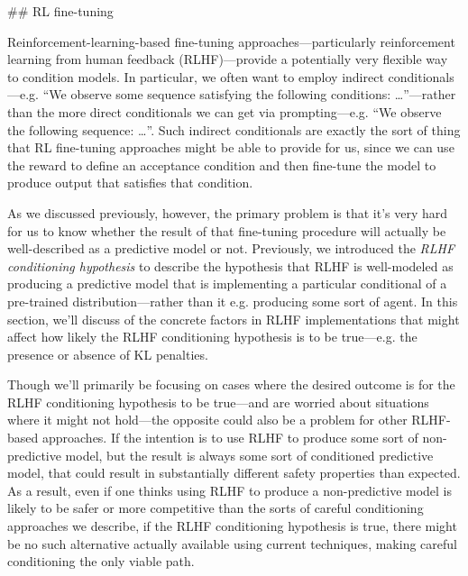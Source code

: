 {## RL fine-tuning

Reinforcement-learning-based fine-tuning approaches---particularly reinforcement learning from human feedback (RLHF)---provide a potentially very flexible way to condition models\cite{TODO: cite https://www.alignmentforum.org/posts/chevXfQmRYrTZnj8r/conditioning-prompts-and-fine-tuning}. In particular, we often want to employ indirect conditionals---e.g. ``We observe some sequence satisfying the following conditions: …''---rather than the more direct conditionals we can get via prompting---e.g. ``We observe the following sequence: …''. Such indirect conditionals are exactly the sort of thing that RL fine-tuning approaches might be able to provide for us, since we can use the reward to define an acceptance condition and then fine-tune the model to produce output that satisfies that condition.

As we discussed previously\cite{TODO: cite TODO}, however, the primary problem is that it's very hard for us to know whether the result of that fine-tuning procedure will actually be well-described as a predictive model or not. Previously, we introduced the \textit{RLHF conditioning hypothesis} to describe the hypothesis that RLHF is well-modeled as producing a predictive model that is implementing a particular conditional of a pre-trained distribution---rather than it e.g. producing some sort of agent. In this section, we'll discuss of the concrete factors in RLHF implementations that might affect how likely the RLHF conditioning hypothesis is to be true---e.g. the presence or absence of KL penalties\cite{TODO: cite https://www.alignmentforum.org/posts/eoHbneGvqDu25Hasc/rl-with-kl-penalties-is-better-seen-as-bayesian-inference}.

Though we'll primarily be focusing on cases where the desired outcome is for the RLHF conditioning hypothesis to be true---and are worried about situations where it might not hold---the opposite could also be a problem for other RLHF-based approaches. If the intention is to use RLHF to produce some sort of non-predictive model, but the result is always some sort of conditioned predictive model, that could result in substantially different safety properties than expected. As a result, even if one thinks using RLHF to produce a non-predictive model is likely to be safer or more competitive than the sorts of careful conditioning approaches we describe, if the RLHF conditioning hypothesis is true, there might be no such alternative actually available using current techniques, making careful conditioning the only viable path.

}
